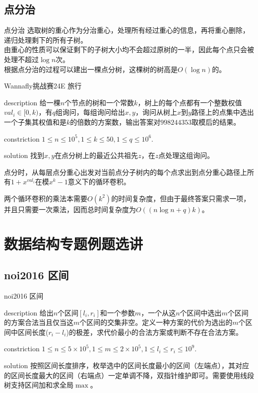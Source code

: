 \documentclass{beamer}
\begin{document}
	\subsection{点分治}
	\begin{frame}{点分治}
		选取树的重心作为分治重心，处理所有经过重心的信息，再将重心删除，递归处理剩下的所有子树。\\
		
		由重心的性质可以保证剩下的子树大小均不会超过原树的一半，因此每个点只会被处理不超过$\log n$次。\\
		
		根据点分治的过程可以建出一棵点分树，这棵树的树高是$O(\log n)$的。
	\end{frame}
	\begin{frame}{Wannafly挑战赛24E 旅行}
		\begin{block}{description}
			给一棵$n$个节点的树和一个常数$k$，树上的每个点都有一个整数权值$val_i\in[0,k)$，有$q$组询问，每组询问给出$x,y$，询问从树上$x$到$y$路径上的点集中选出一个子集其权值和是$k$的倍数的方案数，输出答案对$998244353$取模后的结果。
		\end{block}
		\begin{block}{constriction}
			$1 \le n \le 10^5, 1 \le k \le 50, 1 \le q \le 10^6.$
		\end{block}
		\pause
		\begin{block}{solution}
			找到$x,y$在点分树上的最近公共祖先$z$，在$z$点处理这组询问。
			
			点分时，从每层点分重心出发对当前点分子树内的每个点求出到点分重心路径上所有$1+x^{val_i}$在模$x^k-1$意义下的循环卷积。
			
			两个循环卷积的乘法本需要$O(k^2)$的时间复杂度，但由于最终答案只需求一项，并且只需要一次乘法，因而总时间复杂度为$O((n\log n+q)k)$。
		\end{block}
	\end{frame}
	\section{数据结构专题例题选讲}
	\subsection{noi2016 区间}
	\begin{frame}{noi2016 区间}
		\begin{block}{description}
			给出$n$个区间$[l_i,r_i]$和一个参数$m$，一个从这$n$个区间中选出$m$个区间的方案合法当且仅当这$m$个区间的交集非空。定义一种方案的代价为选出的$m$个区间中区间长度($r_i-l_i$)的极差，求代价最小的合法方案或判断不存在合法方案。
		\end{block}
		\begin{block}{constriction}
			$1 \le n \le 5\times 10^5, 1 \le m \le 2\times 10^5, 1 \le l_i \le r_i \le 10^9.$
		\end{block}
		\pause
		\begin{block}{solution}
			按照区间长度排序，枚举选中的区间长度最小的区间（左端点），其对应的区间长度最大的区间（右端点）一定单调不降，双指针维护即可。需要使用线段树支持区间加和求全局$\max$。
		\end{block}
	\end{frame}
\end{document}

